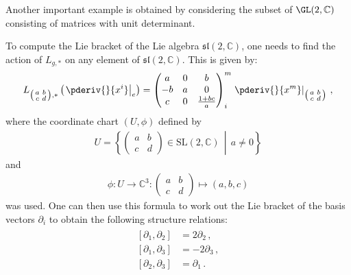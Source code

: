     Another important example is obtained by considering the subset of $\GL(2,\mathbb{C})$ consisting of matrices with unit determinant.
    \begin{example}
        To compute the Lie bracket of the Lie algebra $\mathfrak{sl}(2,\mathbb{C})$, one needs to find the action of $L_{g,*}$ on any element of $\mathfrak{sl}(2,\mathbb{C})$. This is given by:
        \begin{gather}
            L_{\left(\begin{smallmatrix}a&b\\c&d\end{smallmatrix}\right),*}\left(\left.\pderiv{}{x^i}\right|_e\right)
            = \begin{pmatrix}a&0&b\\-b&a&0\\c&0&\frac{1+bc}{a}\end{pmatrix}^m_i\left.\pderiv{}{x^m}\right|_{\left(\begin{smallmatrix}a&b\\c&d\end{smallmatrix}\right)}\,,
        \end{gather}
        where the coordinate chart $(U,\phi)$ defined by
        \begin{gather}
            U = \left\{\begin{pmatrix}a&b\\c&d\end{pmatrix}\in\mathrm{SL}(2,\mathbb{C})\,\middle\vert\,a\neq0\right\}
        \end{gather}
        and
        \begin{gather}
            \phi:U\rightarrow\mathbb{C}^3:\begin{pmatrix}a&b\\c&d\end{pmatrix}\mapsto(a,b,c)
        \end{gather}
        was used. One can then use this formula to work out the Lie bracket of the basis vectors $\partial_i$ to obtain the following structure relations:
        \begin{gather}
            \label{lie:sl2c_lie_brackets}
            \begin{aligned}
                [\partial_1,\partial_2] &= 2\partial_2\,,\\
                [\partial_1,\partial_3] &= -2\partial_3\,,\\
                [\partial_2,\partial_3] &= \partial_1\,.
            \end{aligned}
        \end{gather}
    \end{example}

